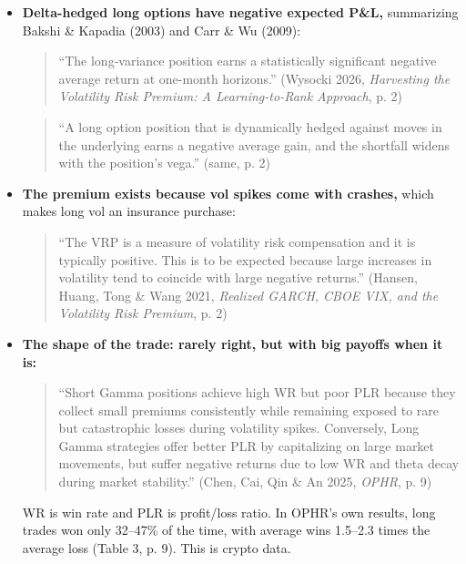 \documentclass{article}
\begin{document}
\begin{itemize}

\item \textbf{Delta-hedged long options have negative expected P\&L,} summarizing Bakshi \& Kapadia (2003) and Carr \& Wu (2009):

\begin{quote}``The long-variance position earns a statistically significant negative average return at one-month horizons.'' (Wysocki 2026, \emph{Harvesting the Volatility Risk Premium: A Learning-to-Rank Approach}, p. 2)\end{quote}

\begin{quote}``A long option position that is dynamically hedged against moves in the underlying earns a negative average gain, and the shortfall widens with the position's vega.'' (same, p. 2)\end{quote}

\item \textbf{The premium exists because vol spikes come with crashes,} which makes long vol an insurance purchase:

\begin{quote}``The VRP is a measure of volatility risk compensation and it is typically positive. This is to be expected because large increases in volatility tend to coincide with large negative returns.'' (Hansen, Huang, Tong \& Wang 2021, \emph{Realized GARCH, CBOE VIX, and the Volatility Risk Premium}, p. 2)\end{quote}

\item \textbf{The shape of the trade: rarely right, but with big payoffs when it is:}

\begin{quote}``Short Gamma positions achieve high WR but poor PLR because they collect small premiums consistently while remaining exposed to rare but catastrophic losses during volatility spikes. Conversely, Long Gamma strategies offer better PLR by capitalizing on large market movements, but suffer negative returns due to low WR and theta decay during market stability.'' (Chen, Cai, Qin \& An 2025, \emph{OPHR}, p. 9)\end{quote}

WR is win rate and PLR is profit/\allowbreak{}loss ratio. In OPHR's own results, long trades won only 32--47\% of the time, with average wins 1.5--2.3 times the average loss (Table 3, p. 9). This is crypto data.

\end{itemize}
\end{document}
